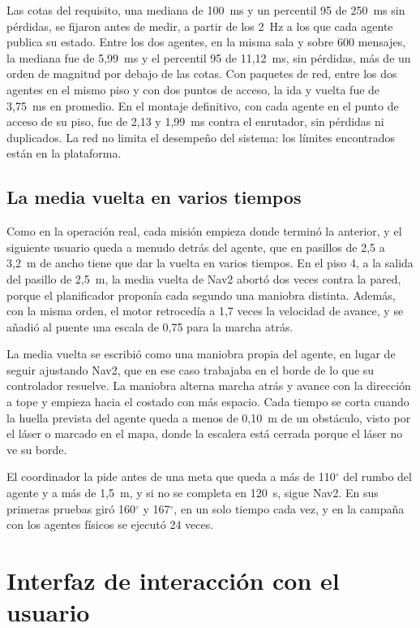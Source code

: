 Las cotas del requisito, una mediana de 100~ms y un percentil 95 de 250~ms sin
pérdidas, se fijaron antes de medir, a partir de los 2~Hz a los que cada agente
publica su estado. Entre los dos agentes, en la misma sala y sobre 600 mensajes, la
mediana fue de 5,99~ms y el percentil 95 de 11,12~ms, sin pérdidas, más de un orden
de magnitud por debajo de las cotas. Con paquetes de red, entre los dos agentes en el mismo piso y
con dos puntos de acceso, la ida y vuelta fue de 3,75~ms en promedio.
En el montaje definitivo, con cada agente en el punto de acceso de su piso, fue de
2,13 y 1,99~ms contra el enrutador, sin pérdidas ni duplicados. La red no limita el
desempeño del sistema: los límites encontrados están en la plataforma.

\subsection{La media vuelta en varios tiempos}
\label{sec:media-vuelta}

Como en la operación real, cada misión empieza donde terminó la anterior, y
el siguiente usuario queda a menudo detrás del agente, que en pasillos de 2,5 a
3,2~m de ancho tiene que dar la vuelta en varios tiempos. En el piso 4, a la
salida del pasillo de 2,5~m, la media vuelta de Nav2 abortó dos veces contra la
pared, porque el planificador proponía cada segundo una maniobra distinta.
Además, con la misma orden, el motor retrocedía a 1,7 veces la velocidad de avance, y se añadió
al puente una escala de 0,75 para la marcha atrás.

La media vuelta se escribió como una maniobra propia del agente, en lugar de seguir ajustando Nav2, que en ese caso trabajaba en el borde de lo que su controlador resuelve. La maniobra alterna
marcha atrás y avance con la dirección a tope y empieza hacia el costado con más
espacio. Cada tiempo se corta cuando la huella prevista del agente queda a
menos de 0,10~m de un obstáculo, visto por el láser o marcado en el mapa, donde la
escalera está cerrada porque el láser no ve su borde.

El coordinador la pide antes de una meta que queda a más de 110$^\circ$ del rumbo
del agente y a más de 1,5~m, y si no se completa en 120~s, sigue Nav2. En sus
primeras pruebas giró 160$^\circ$ y 167$^\circ$, en un solo tiempo cada vez, y en la campaña con los agentes físicos se ejecutó 24 veces.

\section{Interfaz de interacción con el usuario}
\label{sec:oe3}

